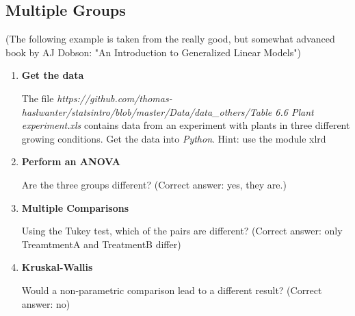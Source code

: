 \subsection*{Multiple Groups}

(The following example is taken from the really good, but somewhat advanced book by AJ Dobson: "An Introduction to Generalized Linear Models")

\begin{enumerate}
  \item \textbf{Get the data}

    The file   \emph{https://github.com/thomas-haslwanter/statsintro/blob/master/Data/data\_others/Table 6.6 Plant experiment.xls} contains data from an experiment with plants in three different growing conditions. Get the data into \emph{Python}.
    Hint: use the module xlrd

  \item \textbf{Perform an ANOVA}

    Are the three groups different?
    (Correct answer: yes, they are.)

  \item \textbf{Multiple Comparisons}

    Using the Tukey test, which of the pairs are different?
    (Correct answer: only TreamtmentA and TreatmentB differ)

  \item \textbf{Kruskal-Wallis}

    Would a non-parametric comparison lead to a different result?
    (Correct answer: no)

\end{enumerate}
